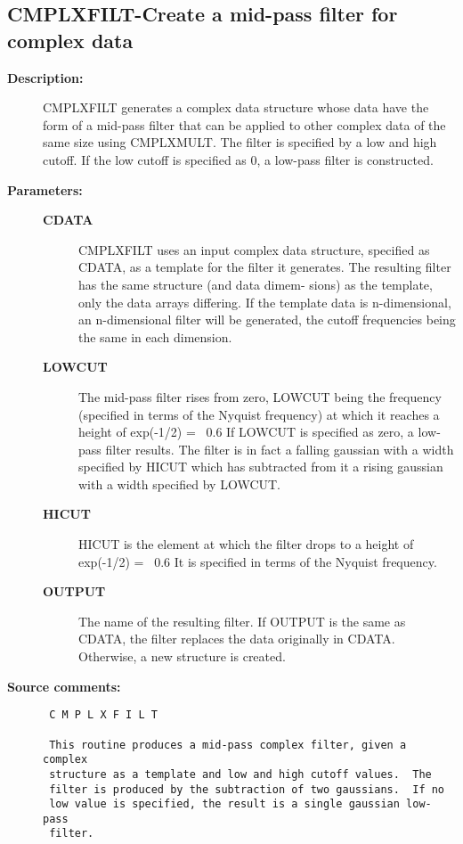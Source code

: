 \subsection{CMPLXFILT-\label{CMPLXFILT}Create a mid-pass filter for complex data}
\begin{description}

\item [{\bf Description:}]
 CMPLXFILT generates a complex data structure whose data have the
 form of a mid-pass filter that can be applied to other complex
 data of the same size using CMPLXMULT.  The filter is specified
 by a low and high cutoff.  If the low cutoff is specified as 0,
 a low-pass filter is constructed.

\item [{\bf Parameters:}]
\begin{description}
\item [{\bf CDATA}]
 CMPLXFILT uses an input complex data structure, specified
 as CDATA, as a template for the filter it generates.  The
 resulting filter has the same structure (and data dimem-
 sions) as the template, only the data arrays differing.
 If the template data is n-dimensional, an n-dimensional
 filter will be generated, the cutoff frequencies being the
 same in each dimension.
\item [{\bf LOWCUT}]
 The mid-pass filter rises from zero, LOWCUT being the
 frequency (specified in terms of the Nyquist frequency)
 at which it reaches a height of exp(-1/2) = ~0.6  If
 LOWCUT is specified as zero, a low-pass filter results.
 The filter is in fact a falling gaussian with a width
 specified by HICUT which has subtracted from it a rising
 gaussian with a width specified by LOWCUT.
\item [{\bf HICUT}]
 HICUT is the element at which the filter drops to a
 height of exp(-1/2) = ~0.6   It is specified in terms
 of the Nyquist frequency.
\item [{\bf OUTPUT}]
 The name of the resulting filter.  If OUTPUT is the
 same as CDATA, the filter replaces the data originally
 in CDATA.  Otherwise, a new structure is created.
\end{description}

\item [{\bf Source comments:}]
\begin{verbatim}
 C M P L X F I L T

 This routine produces a mid-pass complex filter, given a complex
 structure as a template and low and high cutoff values.  The
 filter is produced by the subtraction of two gaussians.  If no
 low value is specified, the result is a single gaussian low-pass
 filter.


\end{verbatim}
\end{description}
